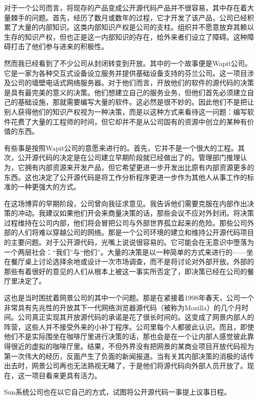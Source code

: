 对于一个公司而言，将现存的产品变成公开源代码产品并不很容易，其中存在着大量棘手的问题。首先，经历了数月或数年的过程，它才开发了该产品，公司已经积累了大量的内部知识。这类内部知识产权是公司的支柱。组织并不愿意放弃其赖以生存的知识产权，但也正是这一内部知识的存在，给外来者们设立了障碍。这种障碍打击了他们参与进来的积极性。

然而我已经看到了不少公司从封闭转变到开放。其中的一个故事便是Wapit公司。它是一家为各种交互式设备设立服务并提供基础设备支持的芬兰公司。这一项目涉及公司的墙壁电话式网络服务器。对于他们而言，开放他们的软件的源代码的决策是具有最完美的意义的决策。他们想建立自己的服务业务，但他们首先必须建立自己的基础设施，那就需要编写大量的软件。这必然是很不妙的。因此他们不是把让别人获得他们的知识产权视为一种决策，而是以这种方式来看待这一问题：编写软件花费了大量的工程师的时间，但它却并不是从公司固有的资源中创立的某种有价值的东西。

有些事是按照Wapit公司的意愿来进行的。首先，它并不是一个很大的工程。其次，公开源代码的决定是在公司建立早期阶段就已经做出了的。管理部门推理认为，它拥有内部资源来开发产品，但它希望更进一步开发出比原有内部资源更多的东西。这也决定了公开源代码是将工作分析程序更进一步作为其他人从事工作的标准的一种更强大的方式。

在这场博弈的早期阶段，公司曾向我征求意见。我告诉他们需要克服在内部作出决策的冲动。我建议如果他们开会来商量决策的话，那些会议不应对外封闭。将决策过程维持在公司内部，他们将会冒把公司与外部世界孤立起来的危险。那些公司外部的人们将难以穿越公司的网络。那是一个公司环境的建立和维持公开源代码项目的主要问题。对于公开源代码，光嘴上说说很容易的。它可能会在无意识中堕落为一个两层社会：“我们”与“他们”。大量的决策是以一种简单的方式来进行的——坐在餐厅桌上讨论选择余地或设计一次市场调查，而不是将讨论对外部开放。外部的那些有着很好的意见的人们从根本上被这一事实所否定了，即决策已经在公司的餐厅里决定了。

这也是当时困扰着网景公司的其中一个问题。那是在紧接着1998年春天，公司一个非常具有先兆性的开放其下一代网络浏览器源代码（被称为Mozilla）的几个月时间。公司真正实现其开放源代码的承诺是花了很长时间的。这变成了网景内部人的阵营，这些人并不接受外来的小补丁程序。公司里每个人都彼此认识。而且，即使他们不是实际围坐在咖啡厅里进行决策的话，那也会是在一个让内部人感觉彼此靠得很近的虚拟的咖啡厅里。结果，不但外界没有把网景的某商业项目开放代码视为第一次伟大的经历，反面产生了负面的新闻报道。当有关其内部决策的消极的话传出去时，网景公司再也无法熟视无睹了，于是他们将源代码向外部人员开放了。现在，这一项目看来更具有活力。

Sun系统公司也在以它自己的方式，试图将公开源代码一事提上议事日程。

